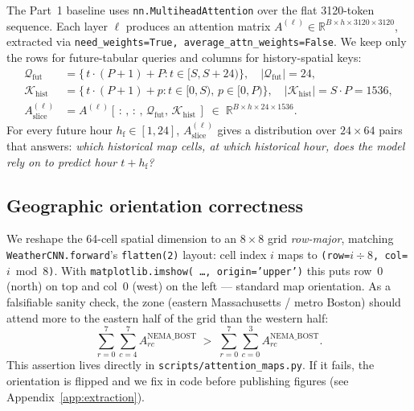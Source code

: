 \documentclass[11pt,letterpaper]{article}
\begin{document}
The Part~1 baseline uses \texttt{nn.MultiheadAttention} over the flat 3120-token sequence. Each layer $\ell$ produces an attention matrix $A^{(\ell)}\in\mathbb{R}^{B\times h\times 3120\times 3120}$, extracted via \texttt{need\_weights=True, average\_attn\_weights=False}. We keep only the rows for future-tabular queries and columns for history-spatial keys:
\begin{equation}
\begin{aligned}
    \mathcal{Q}_{\mathrm{fut}} &= \bigl\{\,t\cdot(P{+}1) + P : t\in[S, S{+}24)\bigr\},\quad |\mathcal{Q}_{\mathrm{fut}}| = 24, \\
    \mathcal{K}_{\mathrm{hist}} &= \bigl\{\,t\cdot(P{+}1) + p : t\in[0, S),\,p\in[0, P)\bigr\},\quad |\mathcal{K}_{\mathrm{hist}}| = S\cdot P = 1536, \\
    A^{(\ell)}_{\mathrm{slice}} &= A^{(\ell)}[\,:\,, \,:\,, \,\mathcal{Q}_{\mathrm{fut}},\, \mathcal{K}_{\mathrm{hist}}\,] \;\in\;\mathbb{R}^{B\times h\times 24\times 1536}.
\end{aligned}
\label{eq:slice}
\end{equation}
For every future hour $h_{\mathrm{f}}\in[1,24]$, $A^{(\ell)}_{\mathrm{slice}}$ gives a distribution over $24 \times 64$ pairs that answers: \emph{which historical map cells, at which historical hour, does the model rely on to predict hour $t{+}h_{\mathrm{f}}$?}

\subsection{Geographic orientation correctness}

We reshape the 64-cell spatial dimension to an $8{\times}8$ grid \emph{row-major}, matching \texttt{WeatherCNN.forward}'s \texttt{flatten(2)} layout: cell index $i$ maps to \texttt{(row=$i\div 8$, col=$i\bmod 8$)}. With \texttt{matplotlib.imshow(\,\dots, origin='upper')} this puts row~0 (north) on top and col~0 (west) on the left --- standard map orientation. As a falsifiable sanity check, the  zone (eastern Massachusetts / metro Boston) should attend more to the eastern half of the grid than the western half:
\begin{equation}
    \sum_{r=0}^{7}\sum_{c=4}^{7} A^{\mathrm{NEMA\_BOST}}_{rc} \;>\; \sum_{r=0}^{7}\sum_{c=0}^{3} A^{\mathrm{NEMA\_BOST}}_{rc}.
    \label{eq:sanity}
\end{equation}
This assertion lives directly in \texttt{scripts/attention\_maps.py}. If it fails, the orientation is flipped and we fix in code before publishing figures (see Appendix~\ref{app:extraction}).
\end{document}
